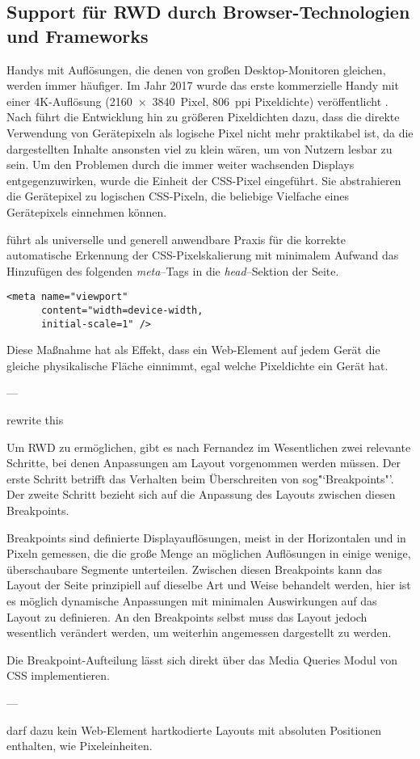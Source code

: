 
\subsection{Support für RWD durch Browser-Technologien und Frameworks}

Handys mit Auflösungen, die denen von großen Desktop-Monitoren gleichen, werden immer häufiger.
Im Jahr 2017 wurde das erste kommerzielle Handy mit einer 4K-Auflösung (2160 × 3840 Pixel, 806 ppi Pixeldichte) veröffentlicht \autocite{Wikipedia.SonyXperiaZ5Premium.2024}.
Nach \autocite{Harmsen.2018} führt die Entwicklung hin zu größeren Pixeldichten dazu, dass die direkte Verwendung von Gerätepixeln als logische Pixel nicht mehr praktikabel ist, da die dargestellten Inhalte ansonsten viel zu klein wären, um von Nutzern lesbar zu sein.
Um den Problemen durch die immer weiter wachsenden Displays entgegenzuwirken, wurde die Einheit der CSS-Pixel eingeführt.
Sie abstrahieren die Gerätepixel zu logischen CSS-Pixeln, die beliebige Vielfache eines Gerätepixels einnehmen können.

\autocite{JiangResponsiveWebDesignModeAndApplication.2014} führt als universelle und generell anwendbare Praxis für die korrekte automatische Erkennung der CSS-Pixelskalierung mit minimalem Aufwand das Hinzufügen des folgenden \emph{meta}--Tags in die \emph{head}--Sektion der Seite.

\begin{verbatim}
<meta name="viewport"
      content="width=device-width,
      initial-scale=1" />
\end{verbatim}

Diese Maßnahme hat als Effekt, dass ein Web-Element auf jedem Gerät die gleiche physikalische Fläche einnimmt, egal welche Pixeldichte ein Gerät hat.

---

rewrite this

Um RWD zu ermöglichen, gibt es nach Fernandez \autocite[S. 3]{MobileWebResponsiveWebdesign.Fernandez.2012} im Wesentlichen zwei relevante Schritte, bei denen Anpassungen am Layout vorgenommen werden müssen.
Der erste Schritt betrifft das Verhalten beim Überschreiten von sog\. "`Breakpoints"'.
Der zweite Schritt bezieht sich auf die Anpassung des Layouts zwischen diesen Breakpoints.

Breakpoints sind definierte Displayauflösungen, meist in der Horizontalen und in Pixeln gemessen, die die große Menge an möglichen Auflösungen in einige wenige, überschaubare Segmente unterteilen.
Zwischen diesen Breakpoints kann das Layout der Seite prinzipiell auf dieselbe Art und Weise behandelt werden, hier ist es möglich dynamische Anpassungen mit minimalen Auswirkungen auf das Layout zu definieren.
An den Breakpoints selbst muss das Layout jedoch wesentlich verändert werden, um weiterhin angemessen dargestellt zu werden.

Die Breakpoint-Aufteilung lässt sich direkt über das Media Queries Modul von CSS implementieren.

---

\autocite{Katajisto.CreatingSupportContent.2015} darf dazu kein Web-Element hartkodierte Layouts mit absoluten Positionen enthalten, wie Pixeleinheiten.
